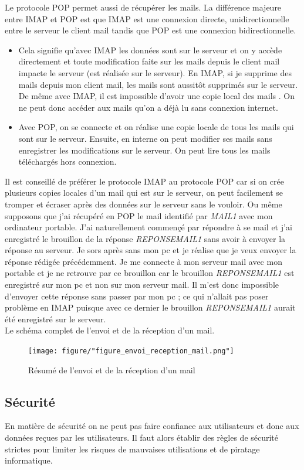 \documentclass[a4paper,12pt,french]{report} %
\begin{document}
Le protocole POP permet aussi de récupérer les mails. La différence majeure entre IMAP et POP est que IMAP est une connexion directe, unidirectionnelle  entre le serveur le client mail tandis que POP est une connexion bidirectionnelle.
\begin{itemize}
	\item Cela signifie qu'avec IMAP les données sont sur le serveur et on y accède directement et toute modification faite sur les mails depuis le client mail impacte le serveur (est réalisée sur le serveur). En IMAP, si je supprime des mails depuis mon client mail, les mails sont aussitôt supprimés sur le serveur. De même avec IMAP, il est impossible d'avoir une copie local des mails . On ne peut donc accéder aux mails qu'on a déjà lu sans connexion internet.
	\item Avec POP, on se connecte et on réalise une copie locale de tous les mails qui sont sur le serveur. Ensuite, en interne on peut modifier ses mails sans enregistrer les modifications sur le serveur. On peut lire tous les mails téléchargés hors connexion.  
\end{itemize} 
	Il est conseillé de préférer le protocole IMAP au protocole POP car si on crée plusieurs copies locales d'un mail qui est sur le serveur, on peut facilement se tromper et écraser après des données sur le serveur sans le vouloir. Ou même supposons que j'ai récupéré en POP le mail identifié par \emph{MAIL1} avec mon ordinateur portable. J'ai naturellement commençé par répondre à se mail et j'ai enregistré le brouillon de la réponse \emph{REPONSEMAIL1} sans avoir à envoyer la réponse au serveur. Je sors après sans mon pc et je réalise que je veux envoyer la réponse rédigée précédemment. Je me connecte à mon serveur mail avec mon portable et je ne retrouve par ce brouillon car le brouillon  \emph{REPONSEMAIL1} est enregistré sur mon pc et non sur mon serveur mail. Il m'est donc impossible d'envoyer cette réponse sans passer par mon pc ; ce qui n'allait  pas poser problème en IMAP puisque avec ce dernier le brouillon \emph{REPONSEMAIL1} aurait été enregistré sur le serveur. \\
	Le schéma complet de l'envoi et de la réception d'un mail.
\begin{figure}[H]
\centering
\texttt{[image: figure/"figure\_envoi\_reception\_mail.png"]} 
\caption{Résumé de l'envoi et de la réception d'un mail} \label{Résumé de l'envoi et de la reception d'un mai}
\end{figure}

\subsection{Sécurité}
En matière de sécurité on ne peut pas faire confiance aux utilisateurs et donc aux données reçues par les utilisateurs. Il faut alors établir des règles de sécurité strictes pour limiter les risques de mauvaises utilisations et de piratage informatique.
\end{document}
